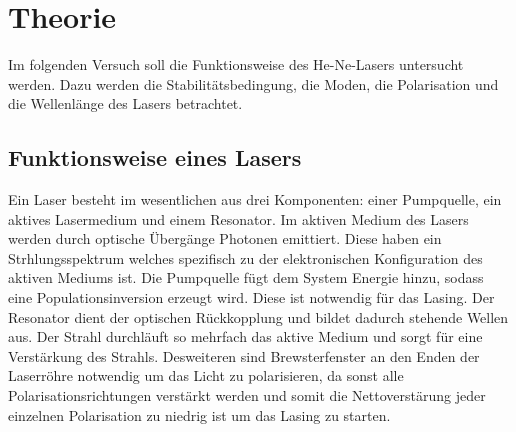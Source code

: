 \section{Theorie}
\label{sec:Theorie}
Im folgenden Versuch soll die Funktionsweise des He-Ne-Lasers untersucht werden.
Dazu werden die Stabilitätsbedingung, die Moden, die Polarisation und die Wellenlänge des Lasers betrachtet.
\\
\subsection{Funktionsweise eines Lasers}
Ein Laser besteht im wesentlichen aus drei Komponenten: einer Pumpquelle, ein aktives Lasermedium und einem Resonator.
Im aktiven Medium des Lasers werden durch optische Übergänge Photonen emittiert. Diese haben ein Strhlungsspektrum welches spezifisch zu der elektronischen
Konfiguration des aktiven Mediums ist. Die Pumpquelle fügt dem System Energie hinzu, sodass eine Populationsinversion erzeugt wird. Diese ist notwendig für das Lasing.
Der Resonator dient der optischen Rückkopplung und bildet dadurch stehende Wellen aus.
Der Strahl durchläuft so mehrfach das aktive Medium und sorgt für eine Verstärkung des Strahls.
Desweiteren sind Brewsterfenster an den Enden der Laserröhre notwendig um das Licht zu polarisieren, da sonst alle Polarisationsrichtungen verstärkt werden und somit die Nettoverstärung
jeder einzelnen Polarisation zu niedrig ist um das Lasing zu starten.

